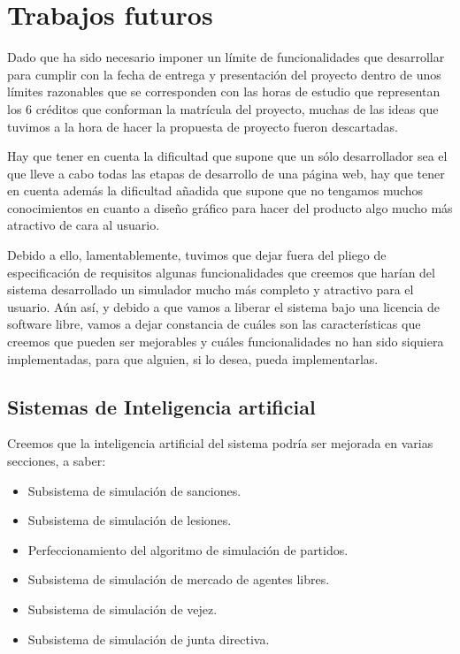 \section{Trabajos futuros}
Dado que ha sido necesario imponer un límite de funcionalidades que desarrollar
para cumplir con la fecha de entrega y presentación del proyecto dentro de unos
límites razonables que se corresponden con las horas de estudio que representan
los 6 créditos que conforman la matrícula del proyecto, muchas de las ideas que
tuvimos a la hora de hacer la propuesta de proyecto fueron descartadas.

Hay que tener en cuenta la dificultad que supone que un sólo desarrollador sea
el que lleve a cabo todas las etapas de desarrollo de una página web, hay que
tener en cuenta además la dificultad añadida que supone que no tengamos muchos
conocimientos en cuanto a diseño gráfico para hacer del producto algo mucho más
atractivo de cara al usuario.

Debido a ello, lamentablemente, tuvimos que dejar fuera del pliego de
especificación de requisitos algunas funcionalidades que creemos que harían del
sistema desarrollado un simulador mucho más completo y atractivo para el
usuario. Aún así, y debido a que vamos a liberar el sistema bajo una licencia de
software libre, vamos a dejar constancia de cuáles son las características que
creemos que pueden ser mejorables y cuáles funcionalidades no han sido siquiera
implementadas, para que alguien, si lo desea, pueda implementarlas.

\subsection{Sistemas de Inteligencia artificial}

Creemos que la inteligencia artificial del sistema podría ser mejorada en varias
secciones, a saber:

\begin{itemize}
\item Subsistema de simulación de sanciones.
\item Subsistema de simulación de lesiones.
\item Perfeccionamiento del algoritmo de simulación de partidos.
\item Subsistema de simulación de mercado de agentes libres.
\item Subsistema de simulación de vejez.
\item Subsistema de simulación de junta directiva.
\end{itemize}

